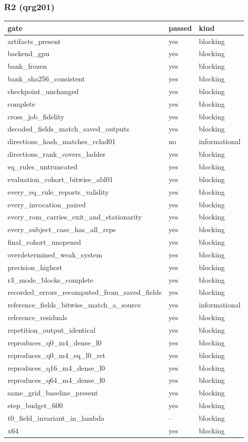 \documentclass[11pt]{article}
\begin{document}
\subsubsection{R2 (qrg201)}
\begin{table}[htbp]\centering\small
\begin{tabular}{lll}\hline
gate & passed & kind \\ \hline
artifacts\_present & yes & blocking \\
backend\_gpu & yes & blocking \\
bank\_frozen & yes & blocking \\
bank\_sha256\_consistent & yes & blocking \\
checkpoint\_unchanged & yes & blocking \\
complete & yes & blocking \\
cross\_job\_fidelity & yes & blocking \\
decoded\_fields\_match\_saved\_outputs & yes & blocking \\
directions\_hash\_matches\_cclad01 & no & informational \\
directions\_rank\_covers\_ladder & yes & blocking \\
eq\_rules\_untruncated & yes & blocking \\
evaluation\_cohort\_bitwise\_abl01 & yes & blocking \\
every\_eq\_rule\_reports\_validity & yes & blocking \\
every\_invocation\_paired & yes & blocking \\
every\_rom\_carries\_exit\_and\_stationarity & yes & blocking \\
every\_subject\_case\_has\_all\_reps & yes & blocking \\
final\_cohort\_unopened & yes & blocking \\
overdetermined\_weak\_system & yes & blocking \\
precision\_highest & yes & blocking \\
r3\_mode\_blocks\_complete & yes & blocking \\
recorded\_errors\_recomputed\_from\_saved\_fields & yes & blocking \\
reference\_fields\_bitwise\_match\_a\_source & yes & informational \\
reference\_residuals & yes & blocking \\
repetition\_output\_identical & yes & blocking \\
reproduces\_q0\_m4\_dense\_l0 & yes & blocking \\
reproduces\_q0\_m4\_eq\_l0\_ret & yes & blocking \\
reproduces\_q16\_m4\_dense\_l0 & yes & blocking \\
reproduces\_q64\_m4\_dense\_l0 & yes & blocking \\
same\_grid\_baseline\_present & yes & blocking \\
step\_budget\_600 & yes & blocking \\
t0\_field\_invariant\_in\_lambda & -- & blocking \\
x64 & yes & blocking \\
\hline\end{tabular}
\end{table}
\end{document}
